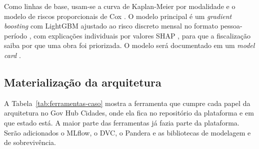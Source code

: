 Como linhas de base, usam-se a curva de Kaplan-Meier por modalidade \cite{kaplan1958} e o modelo de riscos proporcionais de Cox \cite{cox1972}. O modelo principal é um \textit{gradient boosting} com LightGBM \cite{ke2017} ajustado ao risco discreto mensal no formato pessoa-período \cite{tutz2016}, com explicações individuais por valores SHAP \cite{lundberg2017}, para que a fiscalização saiba por que uma obra foi priorizada. O modelo será documentado em um \textit{model card} \cite{mitchell2019}.

\subsection{Materialização da arquitetura}
\label{sec:ferramentas-caso}

A Tabela~\ref{tab:ferramentas-caso} mostra a ferramenta que cumpre cada papel da arquitetura no Gov Hub Cidades, onde ela fica no repositório da plataforma \cite{govhubcidades} e em que estado está. A maior parte das ferramentas já fazia parte da plataforma. Serão adicionados o MLflow, o DVC, o Pandera e as bibliotecas de modelagem e de sobrevivência.


